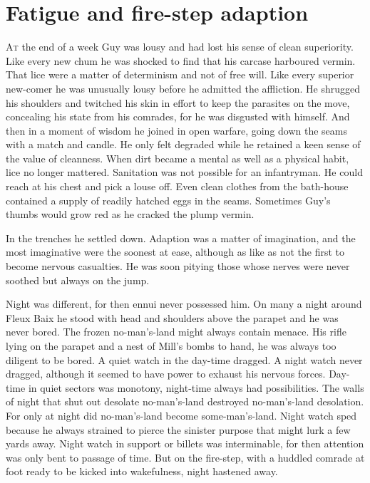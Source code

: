 \chapter*{\textsf{Fatigue and fire-step adaption}}

A\textsc{t} the end of a week Guy was lousy and had lost his sense of clean superiority. Like every new chum he was shocked to find that his carcase harboured vermin. That lice were a matter of determinism and not of free will. Like every superior new-comer he was unusually lousy before he admitted the affliction. He shrugged his shoulders and twitched his skin in effort to keep the parasites on the move, concealing his state from his comrades, for he was disgusted with himself. And then in a moment of wisdom he joined in open warfare, going down the seams with a match and candle. He only felt degraded while he retained a keen sense of the value of cleanness. When dirt became a mental as well as a physical habit, lice no longer mattered. Sanitation was not possible for an infantryman. He could reach at his chest and pick a louse off. Even clean clothes from the bath-house contained a supply of readily hatched eggs in the seams. Sometimes Guy's thumbs would grow red as he cracked the plump vermin.

In the trenches he settled down. Adaption was a matter of imagination, and the most imaginative were the soonest at ease, although as like as not the first to become nervous casualties. He was soon pitying those whose nerves were never soothed but always on the jump.

Night was different, for then ennui never possessed him. On many a night around Fleux Baix he stood with head and shoulders above the parapet and he was never bored. The frozen no-man's-land might always contain menace. His rifle lying on the parapet and a nest of Mill's bombs to hand, he was always too diligent to be bored. A quiet watch in the day-time dragged. A night watch never dragged, although it seemed to have power to exhaust his nervous forces. Day-time in quiet sectors was monotony, night-time always had possibilities. The walls of night that shut out desolate no-man's-land destroyed no-man's-land desolation. For only at night did no-man's-land become some-man's-land. Night watch sped because he always strained to pierce the sinister purpose that might lurk a few yards away. Night watch in support or billets was interminable, for then attention was only bent to passage of time. But on the fire-step, with a huddled comrade at foot ready to be kicked into wakefulness, night hastened away.

